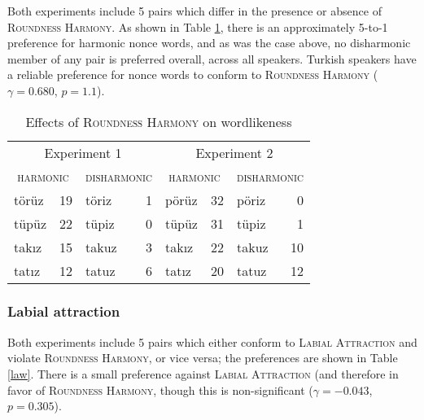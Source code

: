 Both experiments include 5 pairs which differ in the presence or absence of \textsc{Roundness Harmony}. 
As shown in Table \ref{rhw}, there is an approximately 5-to-1 preference for harmonic nonce words, and as was the case above, no disharmonic member of any pair is preferred overall, across all speakers. 
Turkish speakers have a reliable preference for nonce words to conform to \textsc{Roundness Harmony} ($\gamma = 0.680$, $p = 1.1$).

\begin{table}[t]
\center
\begin{tabular}{lrlr|lrlr}
\toprule
\multicolumn{4}{c|}{Experiment 1} & \multicolumn{4}{c}{Experiment 2} \\
\multicolumn{2}{c}{\textsc{harmonic}} & \multicolumn{2}{c|}{\textsc{disharmonic}} & \multicolumn{2}{c}{\textsc{harmonic}} & \multicolumn{2}{c}{\textsc{disharmonic}} \\
\midrule
{törüz} & 19 & {töriz} & 1 & {pörüz} & 32 & {pöriz} & 0  \\
{tüpüz} & 22 & {tüpiz} & 0 & {tüpüz} & 31 & {tüpiz} & 1  \\
{takız} & 15 & {takuz} & 3 & {takız} & 22 & {takuz} & 10 \\
{tatız} & 12 & {tatuz} & 6 & {tatız} & 20 & {tatuz} & 12 \\
\bottomrule
\end{tabular}
\caption{Effects of \textsc{Roundness Harmony} on wordlikeness \citep[from][]{Zimmer1969}}
\label{rhw}
\end{table}

\subsubsection{Labial attraction}

Both experiments include 5 pairs which either conform to \textsc{Labial Attraction} and violate \textsc{Roundness Harmony}, or vice versa; the preferences are shown in Table \ref{law}.
There is a small preference against \textsc{Labial Attraction} (and therefore in favor of \textsc{Roundness Harmony}, though this is non-significant ($\gamma = -0.043$, $p = 0.305$).

